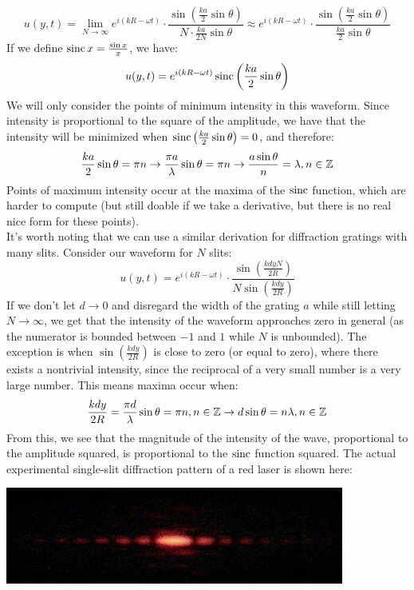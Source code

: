 \[
 u(y, t) = \lim_{N \to \infty} e^{i(kR-\omega t)} \cdot \frac{ \sin \left(\frac{ka}{2} \sin \theta \right)}{N \cdot \frac{ka}{2N} \sin \theta}  \approx e^{i(kR-\omega t)} \cdot \frac{ \sin \left(\frac{ka}{2} \sin \theta \right)}{\frac{ka}{2} \sin \theta} 
\]
If we define $\operatorname{sinc} x = \frac{\sin x}{x}$, we have:
\[
	u(y, t) = e^{i(kR-\omega t)} \operatorname{sinc} \left(\frac{ka}{2} \sin \theta \right)
\]
We will only consider the points of minimum intensity in this waveform. Since intensity is proportional to the square of the amplitude, we have that the intensity will be minimized when $\operatorname{sinc} \left(\frac{ka}{2} \sin \theta \right) = 0$, and therefore:
\[
	\frac{ka}{2} \sin \theta = \pi n \rightarrow \frac{\pi a}{\lambda} \sin \theta = \pi n \rightarrow \frac{a \sin \theta}{n} = \lambda, n \in \mathbb Z
\]
Points of maximum intensity occur at the maxima of the $\operatorname{sinc}$ function, which are harder to compute (but still doable if we take a derivative, but there is no real nice form for these points). \\
It's worth noting that we can use a similar derivation for diffraction gratings with many slits. Consider our waveform for $N$ slits: 
\[
u(y, t) = e^{i(kR-\omega t)} \cdot \frac{ \sin \left(\frac{kdyN}{2R} \right)}{N \sin \left(\frac{kdy}{2R}\right)} 
\]
If we don't let $d \to 0$ and disregard the width of the grating $a$ while still letting $N \to \infty$, we get that the intensity of the waveform approaches zero in general (as the numerator is bounded between $-1$ and $1$ while $N$ is unbounded). The exception is when $\sin \left(\frac{kdy}{2R}\right)$ is close to zero (or equal to zero), where there exists a nontrivial intensity, since the reciprocal of a very small number is a very large number. This means maxima occur when: 
\[
\frac{kdy}{2R} = \frac{\pi d}{\lambda} \sin \theta = \pi n, n \in \mathbb Z \rightarrow d \sin \theta = n \lambda, n \in \mathbb Z
\]
From this, we see that the magnitude of the intensity of the wave, proportional to the amplitude squared, is proportional to the $\operatorname{sinc}$ function squared. The actual experimental single-slit diffraction pattern of a red laser is shown here: 
\begin{center}
	\includegraphics[scale=0.7]{images/waves/singleslitexp.jpg}\\
\end{center}
